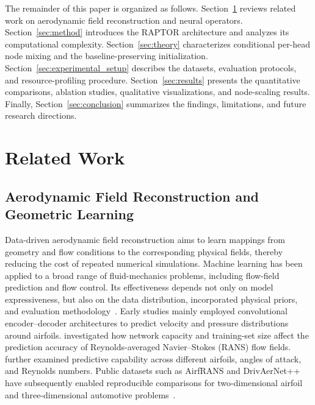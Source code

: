 \documentclass[a4paper,fleqn]{cas-sc}
\begin{document}
The remainder of this paper is organized as follows.
Section~\ref{sec:related_work} reviews related work on aerodynamic
field reconstruction and neural operators.
Section~\ref{sec:method} introduces the RAPTOR architecture and analyzes
its computational complexity.
Section~\ref{sec:theory} characterizes conditional per-head node mixing
and the baseline-preserving initialization.
Section~\ref{sec:experimental_setup} describes the datasets, evaluation
protocols, and resource-profiling procedure.
Section~\ref{sec:results} presents the quantitative comparisons,
ablation studies, qualitative visualizations, and node-scaling results.
Finally, Section~\ref{sec:conclusion} summarizes the findings,
limitations, and future research directions.

\section{Related Work}
\label{sec:related_work}

\subsection{Aerodynamic Field Reconstruction and Geometric Learning}
\label{subsec:aero_reconstruction}

Data-driven aerodynamic field reconstruction aims to learn mappings from geometry and flow conditions to the corresponding physical fields, thereby reducing the cost of repeated numerical simulations. Machine learning has been applied to a broad range of fluid-mechanics problems, including flow-field prediction and flow control. Its effectiveness depends not only on model expressiveness, but also on the data distribution, incorporated physical priors, and evaluation methodology~\citep{ref01}. Early studies mainly employed convolutional encoder--decoder architectures to predict velocity and pressure distributions around airfoils. \citet{ref02} investigated how network capacity and training-set size affect the prediction accuracy of Reynolds-averaged Navier--Stokes (RANS) flow fields. \citet{ref03} further examined predictive capability across different airfoils, angles of attack, and Reynolds numbers. Public datasets such as AirfRANS and DrivAerNet++ have subsequently enabled reproducible comparisons for two-dimensional airfoil and three-dimensional automotive problems~\citep{ref04,ref05}.
\end{document}
